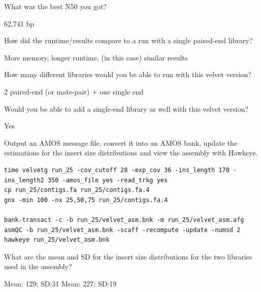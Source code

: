 \begin{questions}
What was the best N50 you got?
\begin{answer}
62,741 bp
\end{answer}

How did the runtime/results compare to a run with a single paired-end library?
\begin{answer}
More memory, longer runtime, (in this case) similar results
\end{answer}

How many different libraries would you be able to run with this velvet version?
\begin{answer}
2 paired-end (or mate-pair) + one single end
\end{answer}

Would you be able to add a single-end library as well with this velvet version?
\begin{answer}
Yes
\end{answer}
\end{questions}


\begin{bonus}
Output an AMOS message file, convert it into an AMOS bank, update the
estimations for the insert size distributions and view the assembly with
Hawkeye.

\begin{lstlisting}
time velvetg run_25 -cov_cutoff 28 -exp_cov 36 -ins_length 170 -ins_length2 350 -amos_file yes -read_trkg yes
cp run_25/contigs.fa run_25/contigs.fa.4
gnx -min 100 -nx 25,50,75 run_25/contigs.fa.4

bank-transact -c -b run_25/velvet_asm.bnk -m run_25/velvet_asm.afg
asmQC -b run_25/velvet_asm.bnk -scaff -recompute -update -numsd 2
hawkeye run_25/velvet_asm.bnk
\end{lstlisting}

\begin{questions}
What are the mean and SD for the insert size distributions for the two libraries
used in the assembly?
\begin{answer}
Mean: 129; SD:31
Mean: 227; SD:19
\end{answer}
\end{questions}

\end{bonus}

